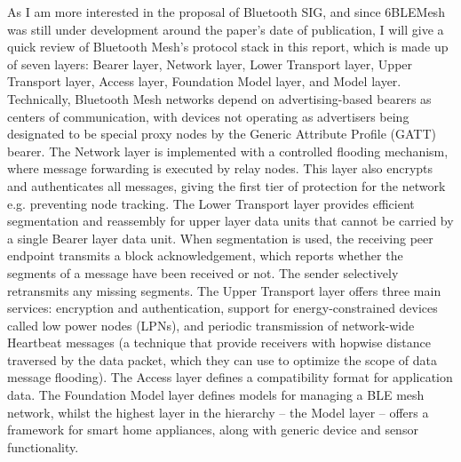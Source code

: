 \documentclass[12pt, a4paper, onside]{article}
\begin{document}
As I am more interested in the proposal of Bluetooth SIG, and since 6BLEMesh was still under development around the paper's date of publication, I will give a quick review of Bluetooth Mesh's protocol stack in this report, which is made up of seven layers: Bearer layer, Network layer, Lower Transport layer, Upper Transport layer, Access layer, Foundation Model layer, and Model layer. Technically, Bluetooth Mesh networks depend on advertising-based bearers as centers of communication, with devices not operating as advertisers being designated to be special proxy nodes by the Generic Attribute Profile (GATT) bearer. The Network layer is implemented with a controlled flooding mechanism, where message forwarding is executed by relay nodes. This layer also encrypts and authenticates all messages, giving the first tier of protection for the network e.g. preventing node tracking. The Lower Transport layer provides efficient segmentation and reassembly for upper layer data units that cannot be carried by a single Bearer layer data unit. When segmentation is used, the receiving peer endpoint transmits a block acknowledgement, which reports whether the segments of a message have been received or not. The sender selectively retransmits any missing segments. The Upper Transport layer offers three main services: encryption and authentication, support for energy-constrained devices called low power nodes (LPNs), and periodic transmission of network-wide Heartbeat messages (a technique that provide receivers with hopwise distance traversed by the data packet, which they can use to optimize the scope of data message flooding). The Access layer defines a compatibility format for application data. The Foundation Model layer defines models for managing a BLE mesh network, whilst the highest layer in the hierarchy -- the Model layer -- offers a framework for smart home appliances, along with generic device and sensor functionality.
\end{document}
